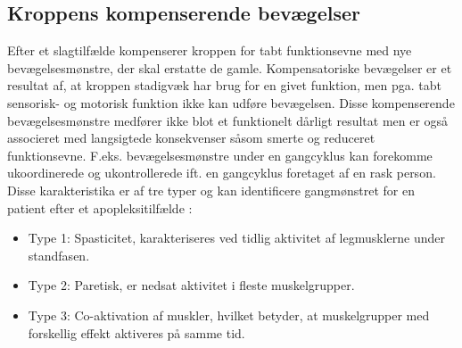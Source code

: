 \subsection{Kroppens kompenserende bevægelser}
Efter et slagtilfælde kompenserer kroppen for tabt funktionsevne med nye bevægelsesmønstre, der skal erstatte de gamle. Kompensatoriske bevægelser er et resultat af, at kroppen stadigvæk har brug for en givet funktion, men pga. tabt sensorisk- og motorisk funktion ikke kan udføre bevægelsen. Disse kompenserende bevægelsesmønstre medfører ikke blot et funktionelt dårligt resultat men er også associeret med langsigtede konsekvenser såsom smerte og reduceret funktionsevne. \cite{Takeuchi2012,Leea2009} F.eks. bevægelsesmønstre under en gangcyklus kan forekomme ukoordinerede og ukontrollerede ift. en gangcyklus foretaget af en rask person. Disse karakteristika er af tre typer og kan identificere gangmønstret for en patient efter et apopleksitilfælde  \cite{Lamontagne2006}:
\begin{itemize}
\item Type 1: Spasticitet, karakteriseres ved tidlig aktivitet af legmusklerne under standfasen.
\item Type 2: Paretisk, er nedsat aktivitet i fleste muskelgrupper.
\item Type 3: Co-aktivation af muskler, hvilket betyder, at muskelgrupper med forskellig effekt aktiveres på samme tid.
\end{itemize}

